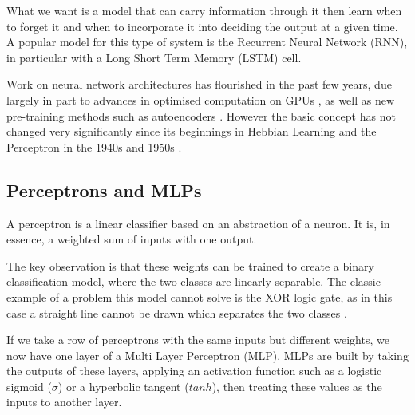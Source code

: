 \documentclass[bsc,singlespacing,logo, parskip, deptreport]{infthesis}
\begin{document}
What we want is a model that can carry information through it then learn when to forget it and when to incorporate it into deciding the output at a given time. A popular model for this type of system is the Recurrent Neural Network (RNN), in particular with a Long Short Term Memory (LSTM) cell.

Work on neural network architectures has flourished in the past few years, due largely in part to advances in optimised computation on GPUs \cite{oh2004gpu}\cite{krizhevsky2012imagenet}, as well as new pre-training methods such as autoencoders \cite{hinton2006reducing}\cite{vincent2008extracting}\cite{deng2010binary}. However the basic concept has not changed very significantly since its beginnings in Hebbian Learning and the Perceptron in the 1940s and 1950s \cite{hebb1949first} \cite{rosenblatt1958perceptron}.

\subsection{Perceptrons and MLPs}

A perceptron is a linear classifier based on an abstraction of a neuron. It is, in essence, a weighted sum of inputs with one output.

\begin{center}
\end{center}

The key observation is that these weights can be trained to create a binary classification model, where the two classes are linearly separable. The classic example of a problem this model cannot solve is the XOR logic gate, as in this case a straight line cannot be drawn which separates the two classes \cite{minsky1969perceptrons}.

If we take a row of perceptrons with the same inputs but different weights, we now have one layer of a Multi Layer Perceptron (MLP). MLPs are built by taking the outputs of these layers, applying an activation function such as a logistic sigmoid ($\sigma$) or a hyperbolic tangent ($tanh$), then treating these values as the inputs to another layer.
\end{document}
